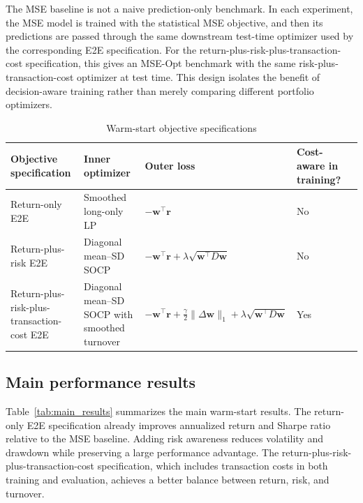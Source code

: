 \documentclass[11pt]{article}
\begin{document}
The MSE baseline is not a naive prediction-only benchmark. In each experiment, the MSE model is trained with the statistical MSE objective, and then its predictions are passed through the same downstream test-time optimizer used by the corresponding E2E specification. For the return-plus-risk-plus-transaction-cost specification, this gives an MSE-Opt benchmark with the same risk-plus-transaction-cost optimizer at test time. This design isolates the benefit of decision-aware training rather than merely comparing different portfolio optimizers.

\begin{table}[H]
\centering
\caption{Warm-start objective specifications}
\label{tab:model_variants}
\small
\begin{tabularx}{\textwidth}{p{}p{}p{}p{}X}
\toprule
Objective specification & Inner optimizer & Outer loss & Cost-aware in training?\\
\midrule
Return-only E2E & Smoothed long-only LP & $-\bm w^\top \bm r$ & No\\
Return-plus-risk E2E & Diagonal mean--SD SOCP & $-\bm w^\top \bm r+\lambda\sqrt{\bm w^\top D\bm w}$ & No  \\
Return-plus-risk-plus-transaction-cost E2E & Diagonal mean--SD SOCP with smoothed turnover & $-\bm w^\top \bm r+\frac{\gamma}{2}\|\Delta \bm w\|_1+\lambda\sqrt{\bm w^\top D\bm w}$ & Yes \\
\bottomrule
\end{tabularx}
\end{table}

\subsection{Main performance results}

Table~\ref{tab:main_results} summarizes the main warm-start results. The return-only E2E specification already improves annualized return and Sharpe ratio relative to the MSE baseline. Adding risk awareness reduces volatility and drawdown while preserving a large performance advantage. The return-plus-risk-plus-transaction-cost specification, which includes transaction costs in both training and evaluation, achieves a better balance between return, risk, and turnover.
\end{document}
